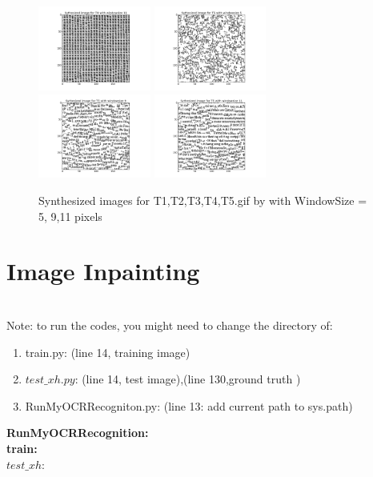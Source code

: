 \documentclass{extarticle}
\theoremstyle{definition}
\theoremstyle{definition}
\begin{document}
\begin{figure}[H]
	\includegraphics[width = 0.33\textwidth]{./figures/Syth_T4_size_11.png}
	\includegraphics[width = 0.33\textwidth]{./figures/Syth_T5_size_5.png}
	\includegraphics[width = 0.33\textwidth]{./figures/Syth_T5_size_9.png}
	\includegraphics[width = 0.33\textwidth]{./figures/Syth_T5_size_11.png}
	\caption{Synthesized images for T1,T2,T3,T4,T5.gif by with WindowSize = 5, 9,11 pixels}
	\label{fig_syth}
\end{figure}
\section{Image Inpainting}

\pagebreak
{}\\
Note: to run the codes, you might need to change the directory of:\\
\begin{enumerate}
	\item train.py: (line 14, training image)\\
	\item $test\_xh.py$: (line 14, test image),(line 130,ground truth )\\
	\item RunMyOCRRecogniton.py: (line 13: add current path to sys.path)\\
\end{enumerate}


\textbf{RunMyOCRRecognition:} \\

\pagebreak
\textbf{train:} \\

\pagebreak
\textbf{$test\_xh:$} \\

\end{document}
